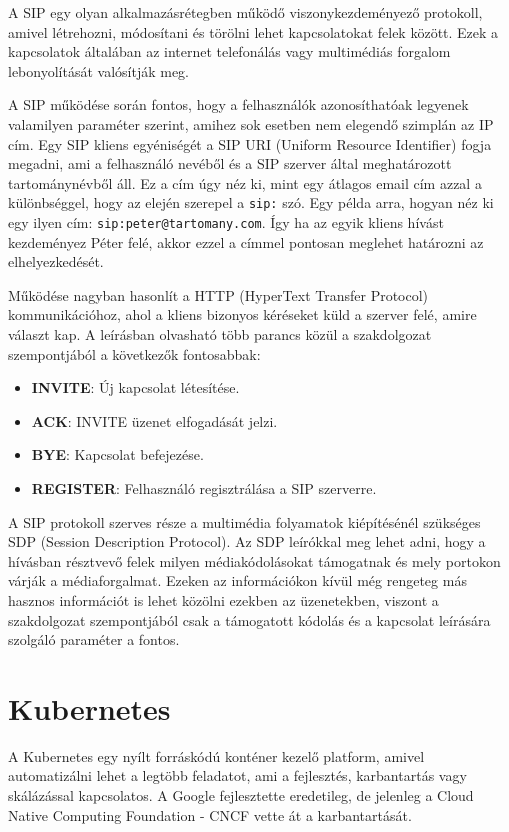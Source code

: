 A SIP egy olyan alkalmazásrétegben működő viszonykezdeményező protokoll, amivel 
létrehozni, módosítani és törölni lehet kapcsolatokat felek között. Ezek a kapcsolatok 
általában az internet telefonálás vagy multimédiás forgalom lebonyolítását valósítják meg. 

A SIP működése során fontos, hogy a felhasználók azonosíthatóak legyenek valamilyen
paraméter szerint, amihez sok esetben nem elegendő szimplán az IP cím. Egy 
SIP kliens egyéniségét a SIP URI (Uniform Resource Identifier) fogja megadni, ami
a  felhasználó nevéből és a SIP szerver által meghatározott tartománynévből áll.
Ez a cím úgy néz ki, mint egy átlagos email cím azzal a különbséggel, hogy az 
elején szerepel a \texttt{sip:} szó. Egy példa arra, hogyan néz ki egy ilyen cím: 
\texttt{sip:peter@tartomany.com}. Így ha az egyik kliens hívást kezdeményez Péter felé,
akkor ezzel a címmel pontosan meglehet határozni az elhelyezkedését. 

Működése nagyban hasonlít a HTTP (HyperText Transfer Protocol) kommunikációhoz, ahol 
a kliens bizonyos kéréseket küld a szerver felé, amire választ kap. A \cite{RFC3261} 
leírásban olvasható több parancs közül a szakdolgozat szempontjából a következők 
fontosabbak: 

\begin{itemize}
	\item \textbf{INVITE}: Új kapcsolat létesítése.
	\item \textbf{ACK}: INVITE üzenet elfogadását jelzi. 
	\item \textbf{BYE}: Kapcsolat befejezése. 
	\item \textbf{REGISTER}: Felhasználó regisztrálása a SIP szerverre. 
\end{itemize}

A SIP protokoll szerves része a multimédia folyamatok kiépítésénél szükséges SDP (Session 
Description Protocol). Az SDP leírókkal meg lehet adni, hogy a hívásban résztvevő felek 
milyen médiakódolásokat támogatnak és mely portokon várják a médiaforgalmat. Ezeken az 
információkon kívül még rengeteg más hasznos információt is lehet közölni ezekben az 
üzenetekben, viszont a szakdolgozat szempontjából csak a támogatott kódolás és a 
kapcsolat leírására szolgáló paraméter a fontos.

\section{Kubernetes}\label{sec:kubernetes}

A Kubernetes egy nyílt forráskódú konténer kezelő platform, amivel automatizálni
lehet a legtöbb feladatot, ami a fejlesztés, karbantartás vagy skálázással 
kapcsolatos. A Google fejlesztette eredetileg, de jelenleg a Cloud Native
Computing Foundation - CNCF vette át a karbantartását. 

